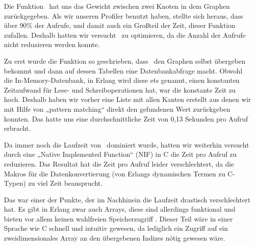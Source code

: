 Die Funktion \gtwght\ hat uns das Gewicht zwischen zwei Knoten in dem
Graphen zurückgegeben.  Als wir unseren Profiler benutzt haben,
stellte sich heraus, dass über 90\% der Aufrufe, und damit auch ein
Großteil der Zeit, dieser Funktion zufallen.  Deshalb hatten wir
versucht \gtwght\ zu optimieren, da die Anzahl der Aufrufe nicht
reduzieren werden konnte.

Zu erst wurde die Funktion so geschrieben, dass \gtwght\ den Graphen
selbst übergeben bekommt und dann auf dessen Tabellen eine
Datenbankabfrage macht.  Obwohl die In-Memory-Datenbank, in Erlang
wird diese ets genannt, einen konstanten Zeitaufwand für Lese- und
Schreiboperationen hat, war die konstante Zeit zu hoch.  Deshalb haben
wir vorher eine Liste mit allen Kanten erstellt aus denen wir mit
Hilfe von „pattern matching“ direkt den gefundenen Wert zurückgeben
konnten.  Das hatte uns eine durchschnittliche Zeit von 0,13 Sekunden
pro Aufruf erbracht.

Da immer noch die Laufzeit von \gtwght\ dominiert wurde, hatten wir
weiterhin versucht durch eine „Native Implemented Function“ (NIF) in C
die Zeit pro Aufruf zu reduzieren.  Das Resultat hat die Zeit pro
Aufruf leider verschlechtert, da die Makros für die Datenkonvertierung
(von Erlangs dynamischen Termen zu C-Typen) zu viel Zeit beansprucht.

Das war einer der Punkte, der im Nachhinein die Laufzeit drastisch
verschlechtert hat.  Es gibt in Erlang zwar auch Arrays, diese sind
allerdings funktional und bieten vor allem keinen wahlfreien
Speicherzugriff \cite[Kapitel~11]{lyse}.  Dieser Teil wäre in einer
Sprache wie C schnell und intuitiv gewesen, da lediglich ein Zugriff
auf ein zweidimensionales Array an den übergebenen Indizes nötig
gewesen wäre.
